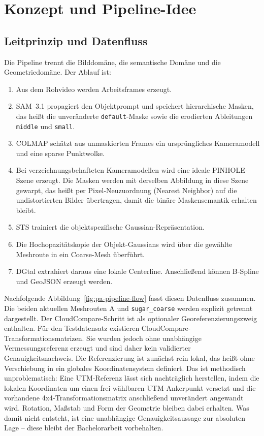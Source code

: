 \section{Konzept und Pipeline-Idee}

\subsection{Leitprinzip und Datenfluss}

Die Pipeline trennt die Bilddomäne, die semantische Domäne und die
Geometriedomäne. Der Ablauf ist:

\begin{enumerate}
  \item Aus dem Rohvideo werden Arbeitsframes erzeugt.
  \item SAM~3.1 propagiert den Objektprompt und speichert hierarchische
        Masken, das heißt die unveränderte \texttt{default}-Maske sowie die
        erodierten Ableitungen \texttt{middle} und \texttt{small}.
  \item COLMAP schätzt aus unmaskierten Frames ein ursprüngliches
        Kameramodell und eine sparse Punktwolke.
  \item Bei verzeichnungsbehafteten Kameramodellen wird eine ideale PINHOLE-
        Szene erzeugt. Die Masken werden mit derselben Abbildung in diese
        Szene gewarpt, das heißt per Pixel-Neuzuordnung (Nearest Neighbor)
        auf die undistortierten Bilder übertragen, damit die binäre
        Maskensemantik erhalten bleibt.
  \item STS trainiert die objektspezifische Gaussian-Repräsentation.
  \item Die Hochopazitätskopie der Objekt-Gaussians wird über die gewählte
        Meshroute in ein Coarse-Mesh überführt.
  \item DGtal extrahiert daraus eine lokale Centerline. Anschließend können
        B-Spline und GeoJSON erzeugt werden.
\end{enumerate}

Nachfolgende Abbildung~\ref{fig:pa-pipeline-flow} fasst diesen Datenfluss zusammen. Die
beiden aktuellen Meshrouten A und \texttt{sugar\_coarse} werden explizit
getrennt dargestellt. Der CloudCompare-Schritt ist als optionaler
Georeferenzierungszweig enthalten. Für den Testdatensatz existieren
CloudCompare-Transformationsmatrizen. Sie wurden jedoch ohne unabhängige
Vermessungsreferenz erzeugt und sind daher kein validierter
Genauigkeitsnachweis. Die Referenzierung ist zunächst rein lokal, das
heißt ohne Verschiebung in ein globales Koordinatensystem definiert. Das ist
methodisch unproblematisch: Eine UTM-Referenz lässt sich nachträglich
herstellen, indem die lokalen Koordinaten um einen frei wählbaren
UTM-Ankerpunkt versetzt und die vorhandene 4x4-Transformationsmatrix
anschließend unverändert angewandt wird. Rotation, Maßstab und Form der
Geometrie bleiben dabei erhalten. Was damit nicht entsteht, ist eine
unabhängige Genauigkeitsaussage zur absoluten Lage -- diese bleibt der
Bachelorarbeit vorbehalten.

